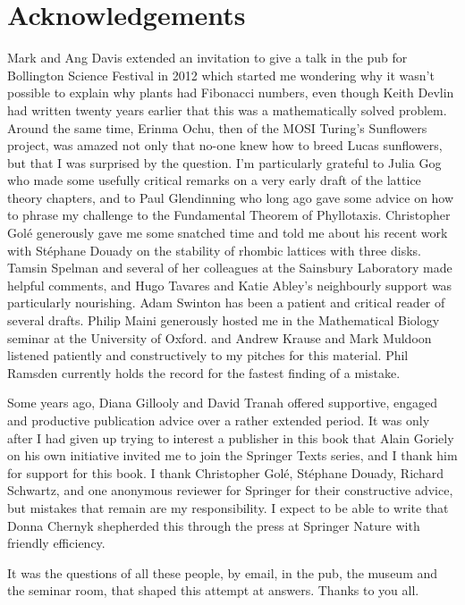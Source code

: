 


\chapter*{Acknowledgements}
Mark and Ang Davis extended an invitation to give a talk in the pub for Bollington Science Festival in 2012 which started me wondering why it wasn't possible to explain why plants had Fibonacci numbers, even though Keith Devlin had written twenty years earlier that this was a mathematically solved problem. Around the same time, Erinma Ochu, then of the MOSI Turing's Sunflowers project, was amazed not only that no-one knew how to breed Lucas sunflowers, but that I was surprised by the question.  
I'm particularly grateful to Julia Gog who made some usefully critical remarks on a very early draft of the lattice theory chapters, and to Paul Glendinning who long ago gave some advice on how to phrase my challenge to the Fundamental Theorem of Phyllotaxis.
Christopher Golé generously gave me some snatched time and told me about his recent work with Stéphane Douady on the stability of rhombic lattices with three disks. Tamsin Spelman and several of her colleagues at the Sainsbury Laboratory made helpful comments, and Hugo Tavares and Katie Abley's neighbourly support was particularly nourishing. Adam Swinton has been a patient and critical reader of several drafts.   Philip Maini generously hosted me in the Mathematical Biology seminar at the University of Oxford. and Andrew Krause and Mark Muldoon listened patiently and constructively to my pitches for this material. Phil Ramsden currently holds the record for the fastest finding of a mistake. 

Some years ago,  Diana Gillooly and David Tranah offered supportive, engaged and productive publication advice over a rather extended period. It was only after I had given up trying to interest a publisher in this book that Alain Goriely on his own initiative invited me to join the Springer Texts series, and I thank him for support for this book. I thank Christopher Golé, Stéphane Douady, Richard Schwartz, and one anonymous reviewer for Springer for their constructive advice, but mistakes that remain are my responsibility. I expect to be able to write that Donna Chernyk shepherded this through the press at Springer Nature with friendly efficiency.

It was the questions of all these people, by email, in the pub, the museum and the seminar room, that shaped this attempt at answers.  Thanks to you all. 

